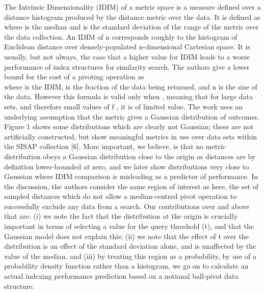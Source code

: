 The Intrinsic Dimensionality (IDIM) of a metric space is a measure defined over a distance histogram produced by the distance metric over the data. It is defined as
\[\]
where  is the median and  is the standard deviation of the range of the metric over the data collection. An IDIM of n corresponds roughly to the histogram of Euclidean distance over densely-populated n-dimensional Cartesian space. It is usually, but not always, the case that a higher value for IDIM leads to a worse performance of index structures for similarity search.
The authors give a lower bound for the cost of a pivoting operation as
\[\]
where is the IDIM,  is the fraction of the data being returned, and n is the size of the data. However this formula is valid only when 
, meaning that for large data sets, and therefore small values of f , it is of limited value.
The work uses an underlying assumption that the metric gives a Gaussian distribution of outcomes. Figure 1 shows some distributions which are clearly not Gaussian; these are not artificially constructed, but show meaningful metrics in use over data sets within the SISAP collection [6].
More important, we believe, is that no metric distribution obeys a Gaussian distribution close to the origin as distances are by definition lower-bounded at zero, and we later show distributions very close to Gaussian where IDIM comparison is misleading as a predictor of performance.
In the discussion, the authors consider the same region of interest as here, the set of sampled distances which do not allow a median-centred pivot operation to successfully exclude any data from a search. Our contributions over and above that are: (i) we note the fact that the distribution at the origin is crucially important in terms of selecting a value for the query threshold (t), and that the Gaussian model does not explain this; (ii) we note that the effect of t over the distribution is an effect of the standard deviation alone, and is unaffected by the value of the median, and (iii) by treating this region as a probability, by use of a probability density function rather than a histogram, we go on to calculate an actual indexing performance prediction based on a notional ball-pivot data structure.

